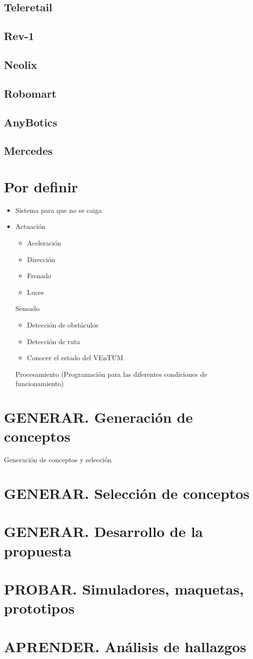 \subsection{Teleretail} 
\subsection{Rev-1} 
\subsection{Neolix}
\subsection{Robomart}  
\subsection{AnyBotics} 
\subsection{Mercedes} 

\section{Por definir}
\begin{itemize}
\item Sistema para que no se caiga
\item Actuación

\begin{itemize}
\item Aceleración
\item Dirección
\item Frenado
\item Luces
\end{itemize}

Sensado
\begin{itemize}
\item Detección de obstáculos
\item Detección de ruta
\item Conocer el estado del VEnTUM
\end{itemize}

Procesamiento (Programación para las diferentes condiciones de funcionamiento)

\end{itemize}




\section{GENERAR. Generación de conceptos}
Generación de conceptos y selección
\section{GENERAR. Selección de conceptos}
\section{GENERAR. Desarrollo de la propuesta}
\section{PROBAR. Simuladores, maquetas, prototipos}

\section{APRENDER. Análisis de hallazgos}
